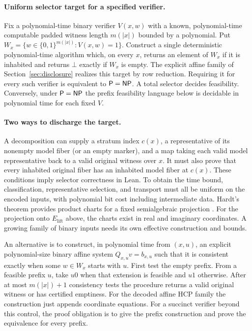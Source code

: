 \paragraph{Uniform selector target for a specified verifier.}
Fix a polynomial-time binary verifier \(V(x,w)\) with a known,
polynomial-time computable padded witness length \(m(|x|)\) bounded by
a polynomial. Put \(W_x=\{w\in\{0,1\}^{m(|x|)}:V(x,w)=1\}\).
Construct a single deterministic polynomial-time algorithm which, on
every \(x\), returns an element of \(W_x\) if it is inhabited and
returns \(\bot\) exactly if \(W_x\) is empty. The explicit affine
family of Section~\ref{sec:disclosure} realizes this target by row
reduction. Requiring it for every such verifier is equivalent to
\(\mathsf{P}=\mathsf{NP}\). A total selector decides feasibility. Conversely, under
\(\mathsf{P}=\mathsf{NP}\) the prefix feasibility language below is decidable in
polynomial time for each fixed \(V\).

\paragraph{Two ways to discharge the target.}
A decomposition can supply a stratum index \(c(x)\), a representative
of its nonempty model fiber (or an empty marker), and a map taking each
valid model representative back to a valid original witness over \(x\).
It must also prove that every inhabited original fiber has an inhabited
model fiber at \(c(x)\). These conditions imply selector correctness
in Lean. To obtain the time bound, classification, representative
selection, and transport must all be uniform on the encoded inputs,
with polynomial bit cost including intermediate data. Hardt's theorem
provides product charts for a fixed semialgebraic projection
\cite[Theorem~4.1]{costeSemialgebraic}. For the projection onto
\(E_{\mathrm{lift}}\) above, the charts exist in real and imaginary
coordinates. A growing family of binary inputs needs its own effective
construction and bounds.

An alternative is to construct, in polynomial time from \((x,u)\), an
explicit polynomial-size binary affine system \(Q_{x,u}v=b_{x,u}\)
such that it is consistent exactly when some \(w\in W_x\) starts with
\(u\). First test the empty prefix. From a feasible prefix \(u\), take
\(u0\) when that extension is feasible and \(u1\) otherwise. After at
most \(m(|x|)+1\) consistency tests the procedure returns a valid
original witness or has certified emptiness. For the decoded affine
HCP family the construction just appends coordinate equations. For a
succinct verifier beyond this control, the proof obligation is to give
the prefix construction and prove the equivalence for every prefix.



